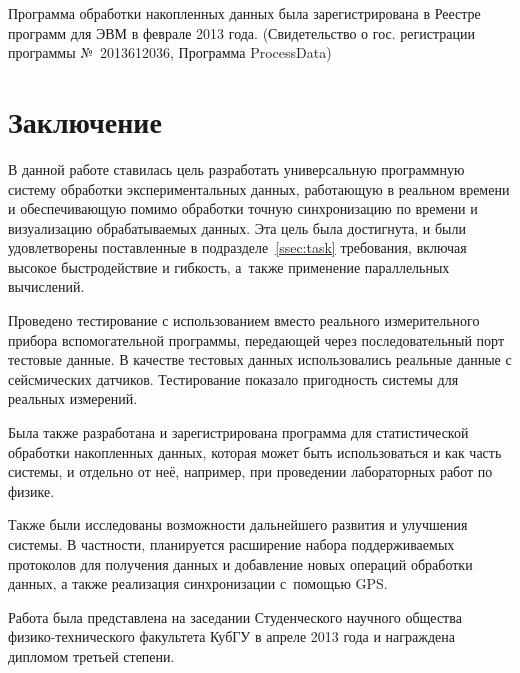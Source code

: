 \documentclass[a4paper, 14pt, titlepage]{extarticle}
\newcommand\sectiontoc[1]{\section*{#1}\addcontentsline{toc}{section}{#1}}
\let\oldsection\section
\renewcommand{\section}{\newpage\oldsection}
\begin{document}
  Программа обработки накопленных данных была зарегистрирована в Реестре программ для ЭВМ в феврале 2013
  года. (Свидетельство о гос. регистрации программы №~2013612036, Программа ProcessData)

  \sectiontoc{Заключение}

  В данной работе ставилась цель разработать универсальную программную систему обработки экспериментальных данных,
  работающую в реальном времени и обеспечивающую помимо обработки точную синхронизацию по времени и
  визуализацию обрабатываемых данных. Эта цель была достигнута, и были удовлетворены поставленные в
  подразделе~\ref{ssec:task} требования, включая высокое быстродействие и гибкость, а~также применение
  параллельных вычислений.

  Проведено тестирование с использованием вместо реального измерительного прибора вспомогательной
  программы, передающей через последовательный порт тестовые данные. В качестве тестовых данных
  использовались реальные данные с сейсмических датчиков. Тестирование показало пригодность системы
  для реальных измерений.

  Была также разработана и зарегистрирована программа для статистической обработки накопленных
  данных, которая может быть использоваться и как часть системы, и отдельно от неё, например, при
  проведении лабораторных работ по физике.

  Также были исследованы возможности дальнейшего развития и улучшения системы. В частности,
  планируется расширение набора поддерживаемых протоколов для получения данных и добавление новых
  операций обработки данных, а также реализация синхронизации с~помощью GPS.

  Работа была представлена на заседании Студенческого научного общества физико-технического факультета
  КубГУ в апреле 2013 года и награждена дипломом третьей степени.

  \begin{flushleft}
    
  \end{flushleft}
\end{document}
